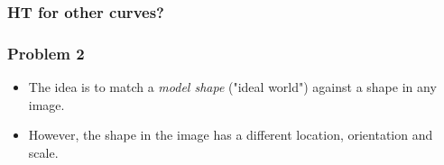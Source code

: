 \documentclass{beamer}
\begin{document}
\begin{frame}
\frametitle{HT for other curves?}

\begin{figure}
\centering
{}
\end{figure}

\end{frame}


\begin{frame}
\frametitle{}

\begin{figure}
\centering
\pgfuseimage
\end{figure}

\end{frame}




\begin{frame}
\frametitle{Problem 2}
\begin{itemize}
\item The idea is to match a \emph{model shape} ("ideal world") against a
shape in any image.
\item However, the shape in the image has a different location, orientation
and scale.
\end{itemize}
\end{frame}
\end{document}
